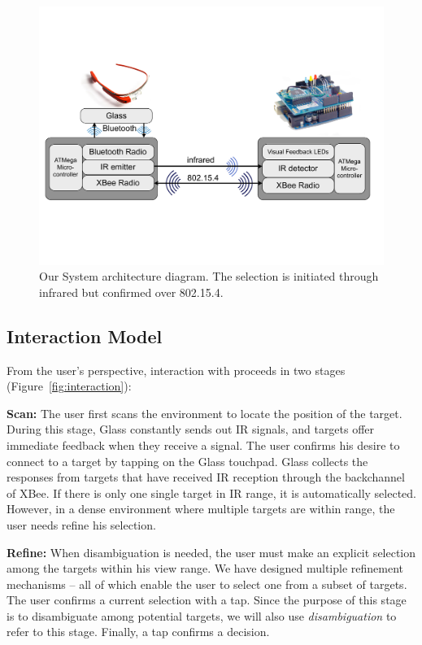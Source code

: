 \begin{figure}[t]
\centering
\includegraphics[width=1\columnwidth]{figures/architecture_new}
\caption{Our System architecture diagram. The selection is initiated through infrared but confirmed over 802.15.4.}
\label{fig:architecture}
\end{figure}



\subsection{Interaction Model}
From the user's perspective, interaction with \systemname proceeds in two stages (Figure~\ref{fig:interaction}): 

{\bf Scan:} The user first scans the environment to locate the position of the target. During this stage, Glass constantly sends out IR signals, and  targets offer immediate feedback when they receive a signal. The user confirms his desire to connect to a target by tapping on the Glass touchpad. Glass collects the responses from targets that have received IR reception through the backchannel of XBee. If there is only one single target in IR range, it is automatically selected. However, in a dense environment where multiple targets are within range, the user needs refine his selection.

{\bf Refine:} When disambiguation is needed, the user must make an explicit selection among the targets within his view range. We have designed multiple refinement mechanisms -- all of which enable the user to select one from a subset of targets. The user confirms a current selection with a tap. Since the purpose of this stage is to disambiguate among potential targets, we will also use {\em disambiguation} to refer to this stage. Finally, a tap confirms a decision.


